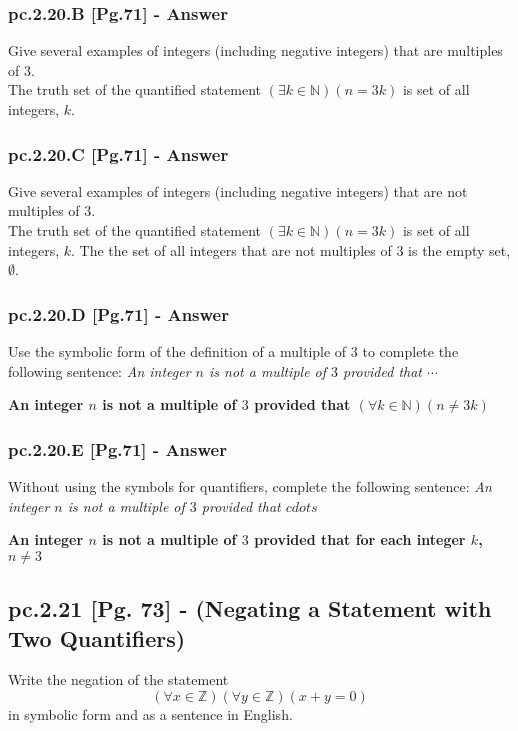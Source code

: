 \subsubsection*{pc.2.20.B [Pg.71] - Answer}
Give several examples of integers (including negative integers) that are multiples of 3. \\

The truth set of the quantified statement $(\exists k \in \mathbb{N})(n = 3k)$ is set of all integers, $k$. \\

\subsubsection*{pc.2.20.C [Pg.71] - Answer}
Give several examples of integers (including negative integers) that are not multiples of 3. \\

The truth set of the quantified statement $(\exists k \in \mathbb{N})(n = 3k)$ is set of all integers, $k$. The  the set of all integers that are not multiples of $3$ is the empty set, $\emptyset$. 

\subsubsection*{pc.2.20.D [Pg.71] - Answer}
Use the symbolic form of the definition of a multiple of $3$ to complete the following sentence: {\it An integer $n$ is not a multiple of $3$ provided that $\cdots$} \\
	\begin{center}
	\bf An integer $n$ is not a multiple of $3$ provided that $(\forall k \in \mathbb{N})(n \neq 3k)$
	\end{center}

\subsubsection*{pc.2.20.E [Pg.71] - Answer}
Without using the symbols for quantifiers, complete the following sentence: {\it An integer $n$ is not a multiple of $3$ provided that $cdots$} \\
	\begin{center}
	\bf An integer $n$ is not a multiple of $3$ provided that for each integer $k$, $n \neq 3$ 
	\end{center}

\newpage
\subsection{pc.2.21 [Pg. 73] - (Negating a Statement with Two Quantifiers)}
Write the negation of the statement \[ (\forall x \in \mathbb{Z})(\forall y \in \mathbb{Z})(x + y = 0) \] in symbolic form and as a sentence in English. \\

